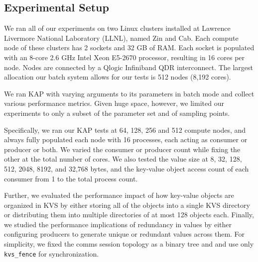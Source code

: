\subsection{Experimental Setup}
We ran all of our experiments on two Linux clusters installed at 
Lawrence Livermore National Laboratory (LLNL),
named Zin and Cab.
Each compute node of these clusters has 2 sockets and 32 GB of RAM.
Each socket is populated with an 8-core 2.6 GHz Intel
Xeon E5-2670 processor, resulting in 16 cores per node.
Nodes are connected by a Qlogic Infiniband QDR interconnect.
The largest allocation our batch system allows for our tests is
512 nodes (8,192 cores).

We ran KAP with varying arguments to its parameters
in batch mode and collect various 
performance metrics. 
Given huge space, however, we limited our experiments to
only a subset of the parameter set and of sampling points.

Specifically, we ran our KAP tests at 64, 128, 256 and 512
compute nodes, and always fully populated each node with
16 processes, each acting as consumer or producer or
both. We varied the consumer or producer count
while fixing the other at the total number of cores.
We also tested the value size at
8, 32, 128, 512, 2048, 8192, and 32,768 bytes,
and the key-value object access count of each consumer
from 1 to the total process count.

Further, we evaluated the performance impact 
of how key-value objects are organized 
in KVS by either storing all of the objects into a single KVS directory
or distributing them into multiple directories of at most 128 objects each.
Finally, we studied the performance implications of 
redundancy in values by either configuring producers to generate
unique or redundant values across them.
For simplicity, we fixed the comms session topology as a binary tree
and and use only {\tt kvs\_fence} for synchronization.

